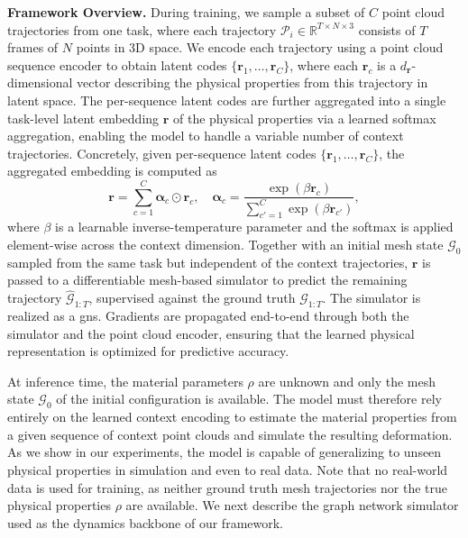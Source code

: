 \textbf{Framework Overview.}
During training, we sample a subset of $C$ point cloud trajectories from one task, where each trajectory $\mathcal{P}_i \in \mathbb{R}^{T \times N \times 3}$ consists of $T$ frames of $N$ points in 3D space.
We encode each trajectory using a point cloud sequence encoder to obtain latent codes $\{\mathbf{r}_1, \dots, \mathbf{r}_C\}$, where each $\mathbf{r}_c$ is a $d_{\mathbf r}$-dimensional vector describing the physical properties from this trajectory in latent space.
The per-sequence latent codes are further aggregated into a single task-level latent embedding $\mathbf{r}$ of the physical properties via a learned softmax aggregation, enabling the model to handle a variable number of context trajectories.
Concretely, given per-sequence latent codes $\{\mathbf{r}_1, \dots, \mathbf{r}_C\}$, the aggregated embedding is computed as
%
\begin{equation}
    \mathbf{r} = \sum_{c=1}^{C} \boldsymbol{\alpha}_c \odot \mathbf{r}_c, \quad \boldsymbol{\alpha}_c = \frac{\exp(\beta \mathbf{r}_c)}{\sum_{c'=1}^{C} \exp(\beta \mathbf{r}_{c'})},
\end{equation}
%
where $\beta$ is a learnable inverse-temperature parameter and the softmax is applied element-wise across the context dimension.
Together with an initial mesh state $\mathcal{G}_0$ sampled from the same task but independent of the context trajectories, $\mathbf{r}$ is passed to a differentiable mesh-based simulator to predict the remaining trajectory $\hat{\mathcal{G}}_{1:T}$, supervised against the ground truth $\mathcal{G}_{1:T}$.
The simulator is realized as a \gls{gns}.
Gradients are propagated end-to-end through both the simulator and the point cloud encoder, ensuring that the learned physical representation is optimized for predictive accuracy.

At inference time, the material parameters $\rho$ are unknown and only the mesh state $\mathcal{G}_0$ of the initial configuration is available.
The model must therefore rely entirely on the learned context encoding to estimate the material properties from a given sequence of context point clouds and simulate the resulting deformation.
As we show in our experiments, the model is capable of generalizing to unseen physical properties in simulation and even to real data.
Note that no real-world data is used for training, as neither ground truth mesh trajectories nor the true physical properties $\rho$ are available. We next describe the graph network simulator used as the dynamics backbone of our framework.

